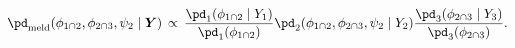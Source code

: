 \begin{equation}
  \pd_{\text{meld}} (\phi_{1 \cap 2}, \phi_{2 \cap 3}, \psi_{2} \mid \boldsymbol{Y})
  \, \propto \, 
  \frac {
    \pd_{1}(\phi_{1 \cap 2} \mid Y_{1})
  } {
    \pd_{1}(\phi_{1 \cap 2})
  }
  \pd_{2}(\phi_{1 \cap 2}, \phi_{2 \cap 3}, \psi_{2} \mid Y_{2})
  \frac {
    \pd_{3}(\phi_{2 \cap 3} \mid Y_{3})
  } {
    \pd_{3}(\phi_{2 \cap 3})
  }.
  \label{eqn:normal-approx-melded-posterior-target}
\end{equation}